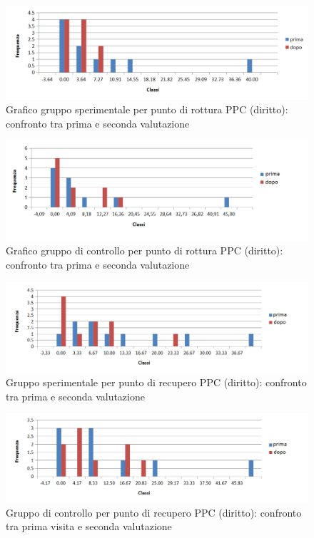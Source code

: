  \begin{figure}[h!]
	\centering
	\includegraphics[scale=0.8]{source/grafici/PPC_DIRITTO_DEFINITIVO_sperimentale.png}
	\caption[figure]{Grafico gruppo sperimentale per punto di rottura PPC (diritto): confronto tra prima e seconda valutazione}
	\label{fig:issuexample}
\end{figure}
 \begin{figure}[h!]
	\centering
	\includegraphics[scale=0.8]{source/grafici/PPC_DIRITTO_DEFINITIVO_GRUPPO_CONTROLLO.png}
	\caption[figure]{Grafico gruppo di controllo per punto di rottura PPC (diritto): confronto tra prima e seconda valutazione}
	\label{fig:issuexample}
\end{figure}
 \begin{figure}[h!]
	\centering
	\includegraphics[scale=0.8]{source/grafici/Recupero_PPC_diritto_Trattati.png}
	\caption[figure]{Gruppo sperimentale per punto di recupero PPC (diritto): confronto tra prima e seconda valutazione}
	\label{fig:issuexample}
\end{figure}
 \begin{figure}[h!]
	\centering
	\includegraphics[scale=0.8]{source/grafici/Recupero_PPC_diritto_Non_Trattati.png}
	\caption[figure]{Gruppo di controllo per punto di recupero PPC (diritto): confronto tra prima visita e seconda valutazione}
	\label{fig:issuexample}
\end{figure}

